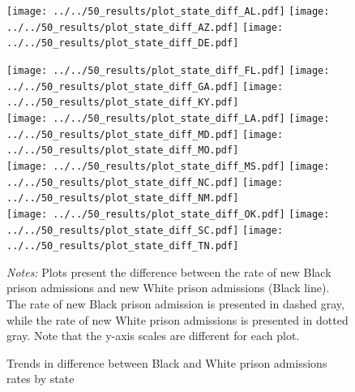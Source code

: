 \documentclass[12pt]{article}
\begin{document}
 \begin{figure}[h!]
 	\begin{center}
 	\caption{Trends in difference between Black and White prison admissions rates by state}
 	\small

 		\vspace{.2in}
       \texttt{[image: ../../50\_results/plot\_state\_diff\_AL.pdf]}
 		\texttt{[image: ../../50\_results/plot\_state\_diff\_AZ.pdf]}
       \texttt{[image: ../../50\_results/plot\_state\_diff\_DE.pdf]}\\

       \vspace{.05in}

 			\texttt{[image: ../../50\_results/plot\_state\_diff\_FL.pdf]}
       \texttt{[image: ../../50\_results/plot\_state\_diff\_GA.pdf]}
       \texttt{[image: ../../50\_results/plot\_state\_diff\_KY.pdf]}\\





       \vspace{.05in}
      \texttt{[image: ../../50\_results/plot\_state\_diff\_LA.pdf]}
 			\texttt{[image: ../../50\_results/plot\_state\_diff\_MD.pdf]}
 			\texttt{[image: ../../50\_results/plot\_state\_diff\_MO.pdf]} \\

       \vspace{.05in}
       \texttt{[image: ../../50\_results/plot\_state\_diff\_MS.pdf]}
       \texttt{[image: ../../50\_results/plot\_state\_diff\_NC.pdf]}
       \texttt{[image: ../../50\_results/plot\_state\_diff\_NM.pdf]}\\

       \vspace{.05in}
       \texttt{[image: ../../50\_results/plot\_state\_diff\_OK.pdf]}
 			\texttt{[image: ../../50\_results/plot\_state\_diff\_SC.pdf]}
 			\texttt{[image: ../../50\_results/plot\_state\_diff\_TN.pdf]}\\
       \smallskip\smallskip\smallskip
 	\label{figure_difference_states1}
 	\end{center}
   {\singlespacing \scriptsize{\emph{Notes:} Plots present the difference between the rate of new Black prison admissions and new White prison admissions (Black line).  The rate of new Black prison admission is presented in dashed gray, while the rate of new White prison admissions is presented in dotted gray.  Note that the y-axis scales are different for each plot.}}
\end{figure} \normalsize
\end{document}
